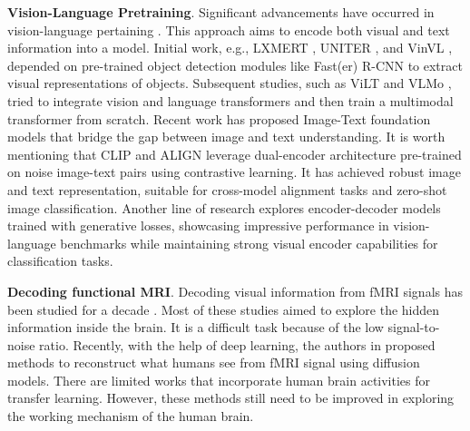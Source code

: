 \noindent
\textbf{Vision-Language Pretraining}. Significant advancements have occurred in vision-language pertaining \cite{radford2021learning, jia2021scaling, zhai2022lit, pham2023combined, wang2021simvlm, wang2022ofa, li2022blip, yu2022coca, zhai2023sigmoid, luo2023lexlip, wang2023equivariant}. This approach aims to encode both visual and text information into a model. Initial work, e.g., LXMERT \cite{tan2019lxmert}, UNITER \cite{chen2020uniter}, and VinVL \cite{zhang2021vinvl}, depended on pre-trained object detection modules like Fast(er) R-CNN \cite{ren2015faster} to extract visual representations of objects. Subsequent studies, such as ViLT \cite{kim2021vilt} and VLMo \cite{bao2022vlmo}, tried to integrate vision and language transformers and then train a multimodal transformer from scratch.
Recent work has proposed Image-Text foundation models that bridge the gap between image and text understanding. It is worth mentioning that CLIP \cite{clip} and ALIGN \cite{align} leverage dual-encoder architecture pre-trained on noise image-text pairs using contrastive learning. It has achieved robust image and text representation, suitable for cross-model alignment tasks and zero-shot image classification. Another line of research \cite{piergiovanni2022answer, wang2021simvlm, wang2022ofa} explores encoder-decoder models trained with generative losses, showcasing impressive performance in vision-language benchmarks while maintaining strong visual encoder capabilities for classification tasks.









\noindent
\textbf{Decoding functional MRI}.
Decoding visual information from fMRI signals has been studied for a decade \cite{haynes2005predicting, thirion2006inverse, kamitani2005decoding, cox2003functional, haxby2001distributed}. Most of these studies aimed to explore the hidden information inside the brain. It is a difficult task because of the low signal-to-noise ratio. Recently, with the help of deep learning, the authors in \cite{chen2023seeing, scotti2023reconstructing, takagi2023high, ozcelik2023natural, lin2022mind, ozcelik2023brain} proposed methods to reconstruct what humans see from fMRI signal using diffusion models. There are limited works \cite{nishida2020brain, nechyba1995human} that incorporate human brain activities for transfer learning. However, these methods still need to be improved in exploring the working mechanism of the human brain. 


